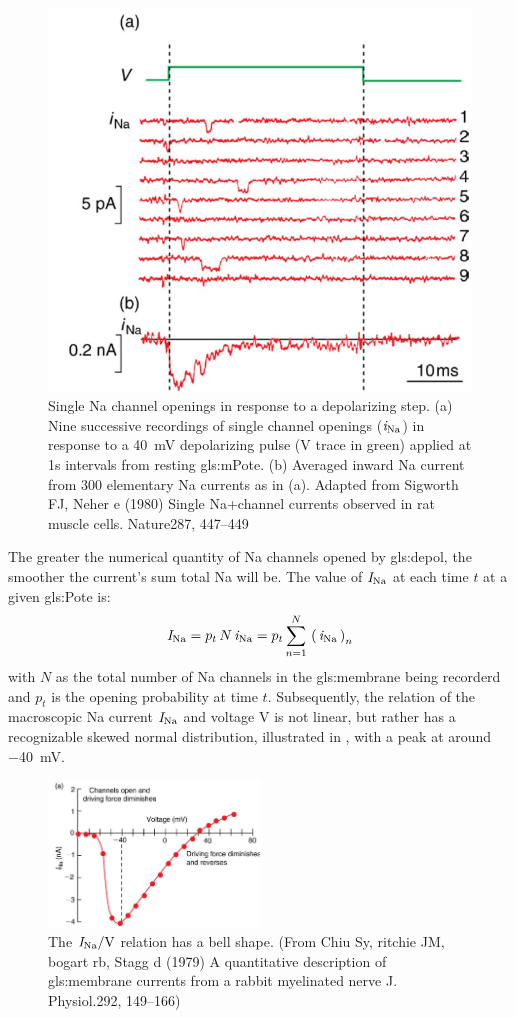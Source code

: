 \documentclass[class={myRUCProject}, crop=false]{standalone}
\begin{document}
\begin{figure}[H]
  \centering
  \includegraphics[width=0.5\linewidth]{Pictures//Anakin/iNa.png}
  \caption{Single \gls{Na} channel openings in response to a depolarizing step. (a) Nine successive recordings of single channel openings (\(\mathit{i}_\mathrm{Na}\)) in response to a \qty{ 40}{\mV} depolarizing pulse (V trace in green) applied at 1s intervals from resting \gls{gls:mPote}. (b) Averaged inward \gls{Na} current from 300 elementary \gls{Na} currents as in (a). Adapted from Sigworth FJ, Neher e (1980) Single Na+channel currents observed in rat muscle cells. Nature287, 447–449 }
  \label{fig:unitcurNa}
\end{figure}

The greater the numerical quantity of \gls{Na} channels opened by \gls{gls:depol}, the smoother the current's sum total \gls{Na} will be. 
The value of \(\mathit{I}_\mathrm{Na}\) at each time \(t\) at a given \gls{gls:Pote} is: 
\begin{equation}\label{eq:nasum}
  \mathit{I}_\mathrm{Na} = p_t \, N \, \mathit{i}_\mathrm{Na} = p_t \sum^N_{n=1} \, \left(\,\mathit{i}_\mathrm{Na}\,\right)_n 
\end{equation}
with \(N\) as the total number of \gls{Na} channels in the \gls{gls:membrane} being recorderd and \(p_t\) is the opening probability at time \(t\). 
Subsequently, the relation of the macroscopic \gls{Na} current \(\mathit{I}_\mathrm{Na}\) and voltage \(\unit{\V}\) is not linear, but rather has a recognizable skewed normal distribution, illustrated in , with a peak at around \qty{-40}{\mV}. 
\begin{figure}[H]
  \centering
  \includegraphics[width=0.5\textwidth]{Pictures//Anakin/I-V.bell.png}
  \caption{The \(\curr\sodium/\unit{\V}\) relation has a bell shape. (From Chiu Sy, ritchie JM, bogart rb, Stagg d (1979) A quantitative description of \gls{gls:membrane} currents from a rabbit myelinated nerve J. Physiol.292, 149–166)}\label{fig:IVdist.}
\end{figure}
 
\end{document}
